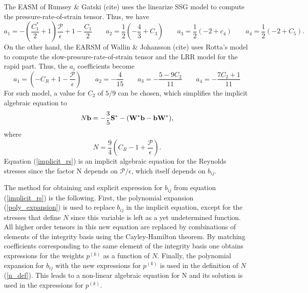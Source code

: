 \documentclass[oneside,a4paper,11pt]{report}
\begin{document}
The EASM of Rumsey \& Gatski (cite) uses the linearize SSG model to compute the pressure-rate-of-strain tensor. Thus, we have
\begin{equation}
a_1 = - \left ( \frac{C_1^*}{2} + 1\right ) \frac{\mathcal{P}}{\epsilon} + 1 - \frac{C_1}{2} \qquad a_2 = \frac{1}{2} \left (-\frac{4}{3} + C_3 \right ) \qquad a_3 = \frac{1}{2} \left (-2 + c_4 \right ) \qquad a_4 = \frac{1}{2} \left (-2 + C_5 \right ).
\end{equation}
On the other hand, the EARSM of Wallin \& Johansson (cite) uses Rotta's model to compute the slow-pressure-rate-of-strain tensor and the LRR model for the rapid part.  Thus, the $a_i$ coefficients become
\begin{equation}
a_1 = \left ( -C_R + 1 - \frac{\mathcal{P}}{\epsilon} \right ) \qquad a_2 = -\frac{4}{15} \qquad a_3 = -\frac{5 - 9 C_2}{11} \qquad a_4 = -\frac{7C_2 + 1}{11}
\end{equation}
For such model, a value for $C_2$ of $5/9$ can be chosen, which simplifies the implicit algebraic equation to
\begin{equation}
\label{implicit_rs}
N \mathbf{b} = -\frac{3}{5} \mathbf{S^*} - (\mathbf{W^*} \mathbf{b} - \mathbf{b} \mathbf{W^*}),
\end{equation}
where 
\begin{equation}
\label{n_def}
N = \frac{9}{4} \left ( C_R - 1 + \frac{\mathcal{P}}{\epsilon} \right ).
\end{equation}
Equation (\ref{implicit_rs}) is an implicit algebraic equation for the Reynolds stresses since the factor N depends on $\mathcal{P}/\epsilon$, which itself depends on $b_{ij}$. 

The method for obtaining and explicit expression for $b_{ij}$ from equation (\ref{implicit_rs}) is the following. First, the polynomial expansion (\ref{poly_expansion}) is used to replace $b_{ij}$ in the implicit equation, except for the stresses that define $N$ since this variable is left as a yet undetermined function. All higher order tensors in this new equation are replaced by combinations of elements of the integrity basis using the Cayley-Hamilton theorem. By matching coefficients corresponding to the same element of the integrity basis one obtains expressions for the weights $p^{(k)}$ as a function of $N$. Finally, the polynomial expansion for $b_{ij}$ with the new  expressions for $p^{(k)}$ is used in the definition of $N$ (\ref{n_def}). This leads to a non-linear algebraic equation for N and its solution is used in the expressions for $p^{(k)}$.
\end{document}
